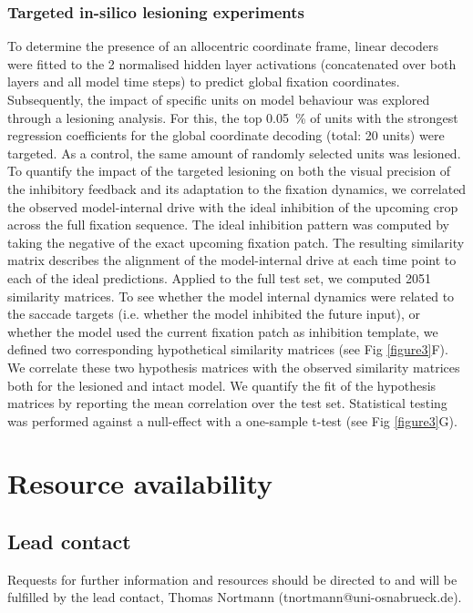 \documentclass[10pt,letterpaper]{article}
\begin{document}
\subsubsection{Targeted in-silico lesioning experiments}
To determine the presence of an allocentric coordinate frame, linear decoders were fitted to the 2 normalised hidden layer activations (concatenated over both layers and all model time steps) to predict global fixation coordinates. Subsequently, the impact of specific units on model behaviour was explored through a lesioning analysis. For this, the top 0.05~\% of units with the strongest regression coefficients for the global coordinate decoding (total: 20 units) were targeted. As a control, the same amount of randomly selected units was lesioned. To quantify the impact of the targeted lesioning on both the visual precision of the inhibitory feedback and its adaptation to the fixation dynamics,  we correlated the observed model-internal drive with the ideal inhibition of the upcoming crop across the full fixation sequence. The ideal inhibition pattern was computed by taking the negative of the exact upcoming fixation patch. The resulting similarity matrix describes the alignment of the model-internal drive at each time point to each of the ideal predictions. Applied to the full test set, we computed 2051 similarity matrices. To see whether the model internal dynamics were related to the saccade targets (i.e. whether the model inhibited the future input), or whether the model used the current fixation patch as inhibition template, we defined two corresponding hypothetical similarity matrices (see Fig \ref{figure3}F). We correlate these two hypothesis matrices with the observed similarity matrices both for the lesioned and intact model. We quantify the fit of the hypothesis matrices by reporting the mean correlation over the test set. Statistical testing was performed against a null-effect with a one-sample t-test (see Fig \ref{figure3}G).

\section{Resource availability}


\subsection{Lead contact} %

Requests for further information and resources should be directed to and will be fulfilled by the lead contact, Thomas Nortmann (tnortmann@uni-osnabrueck.de).
\end{document}
